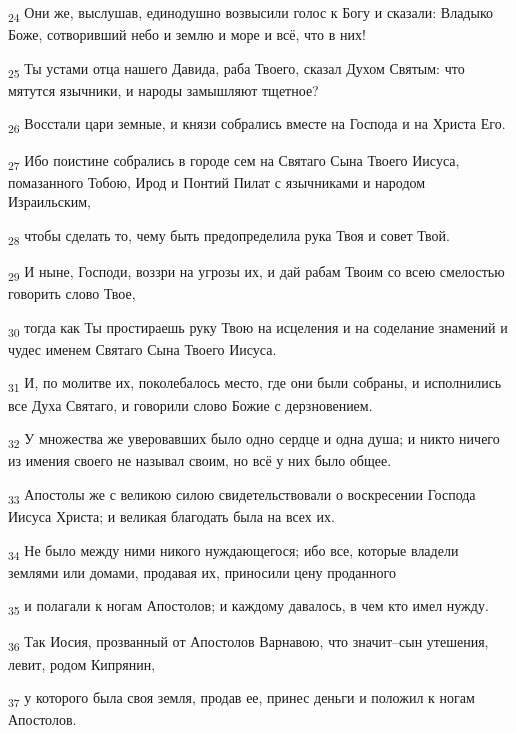 \begin{tcolorbox}
\textsubscript{24} Они же, выслушав, единодушно возвысили голос к Богу и сказали: Владыко Боже, сотворивший небо и землю и море и всё, что в них!
\end{tcolorbox}
\begin{tcolorbox}
\textsubscript{25} Ты устами отца нашего Давида, раба Твоего, сказал Духом Святым: что мятутся язычники, и народы замышляют тщетное?
\end{tcolorbox}
\begin{tcolorbox}
\textsubscript{26} Восстали цари земные, и князи собрались вместе на Господа и на Христа Его.
\end{tcolorbox}
\begin{tcolorbox}
\textsubscript{27} Ибо поистине собрались в городе сем на Святаго Сына Твоего Иисуса, помазанного Тобою, Ирод и Понтий Пилат с язычниками и народом Израильским,
\end{tcolorbox}
\begin{tcolorbox}
\textsubscript{28} чтобы сделать то, чему быть предопределила рука Твоя и совет Твой.
\end{tcolorbox}
\begin{tcolorbox}
\textsubscript{29} И ныне, Господи, воззри на угрозы их, и дай рабам Твоим со всею смелостью говорить слово Твое,
\end{tcolorbox}
\begin{tcolorbox}
\textsubscript{30} тогда как Ты простираешь руку Твою на исцеления и на соделание знамений и чудес именем Святаго Сына Твоего Иисуса.
\end{tcolorbox}
\begin{tcolorbox}
\textsubscript{31} И, по молитве их, поколебалось место, где они были собраны, и исполнились все Духа Святаго, и говорили слово Божие с дерзновением.
\end{tcolorbox}
\begin{tcolorbox}
\textsubscript{32} У множества же уверовавших было одно сердце и одна душа; и никто ничего из имения своего не называл своим, но всё у них было общее.
\end{tcolorbox}
\begin{tcolorbox}
\textsubscript{33} Апостолы же с великою силою свидетельствовали о воскресении Господа Иисуса Христа; и великая благодать была на всех их.
\end{tcolorbox}
\begin{tcolorbox}
\textsubscript{34} Не было между ними никого нуждающегося; ибо все, которые владели землями или домами, продавая их, приносили цену проданного
\end{tcolorbox}
\begin{tcolorbox}
\textsubscript{35} и полагали к ногам Апостолов; и каждому давалось, в чем кто имел нужду.
\end{tcolorbox}
\begin{tcolorbox}
\textsubscript{36} Так Иосия, прозванный от Апостолов Варнавою, что значит--сын утешения, левит, родом Кипрянин,
\end{tcolorbox}
\begin{tcolorbox}
\textsubscript{37} у которого была своя земля, продав ее, принес деньги и положил к ногам Апостолов.
\end{tcolorbox}
